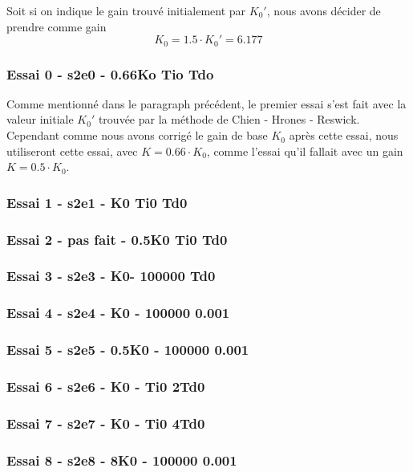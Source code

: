 Soit si on indique le gain trouvé initialement par $K_0'$, nous avons décider de 
prendre comme gain $$K_0 = 1.5 \cdot K_0' = 6.177$$


\subsubsection{Essai 0 - s2e0 - 0.66Ko Tio Tdo} \label{essai-0}
Comme mentionné dans le paragraph précédent, le premier essai s'est fait avec
la valeur initiale $K_0'$ trouvée par la méthode de Chien - Hrones - Reswick.
Cependant comme nous avons corrigé le gain de base $K_0$ après cette essai, nous
utiliseront cette essai, avec $K = 0.66 \cdot K_0$, comme l'essai qu'il fallait
avec un gain $K = 0.5 \cdot K_0$.

\subsubsection{Essai 1 - s2e1 - K0 Ti0 Td0}

\subsubsection{Essai 2 - pas fait - 0.5K0 Ti0 Td0 }

\subsubsection{Essai 3 - s2e3 - K0- 100000 Td0}

\subsubsection{Essai 4 - s2e4 - K0 - 100000 0.001}

\subsubsection{Essai 5 - s2e5 - 0.5K0 - 100000 0.001}

\subsubsection{Essai 6 - s2e6 - K0 - Ti0 2Td0}

\subsubsection{Essai 7 - s2e7 - K0 - Ti0 4Td0}

\subsubsection{Essai 8 - s2e8 - 8K0 - 100000 0.001}


